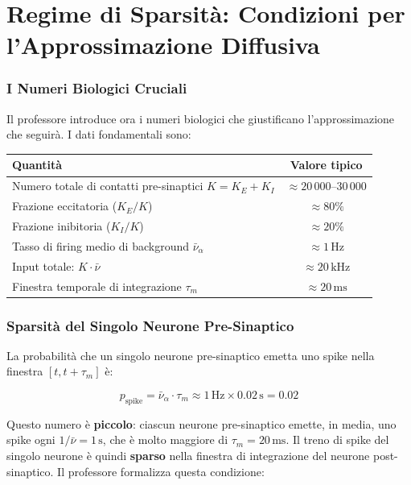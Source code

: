 \section{Regime di Sparsità: Condizioni per l'Approssimazione Diffusiva}

\subsubsection{I Numeri Biologici Cruciali}

Il professore introduce ora i numeri biologici che giustificano l'approssimazione che seguirà. I dati fondamentali sono:

\begin{table}[htbp]
    \centering
    \renewcommand{\arraystretch}{1.3}
    \begin{tabularx}{\textwidth}{|X|c|}
    \hline
    \textbf{Quantità} & \textbf{Valore tipico} \\
    \hline
    Numero totale di contatti pre-sinaptici $K = K_E + K_I$ & $\approx 20\,000$–$30\,000$ \\
    \hline
    Frazione eccitatoria ($K_E / K$) & $\approx 80\%$ \\
    \hline
    Frazione inibitoria ($K_I / K$) & $\approx 20\%$ \\
    \hline
    Tasso di firing medio di background $\bar{\nu}_\alpha$ & $\approx 1\,\text{Hz}$ \\
    \hline
    Input totale: $K \cdot \bar{\nu}$ & $\approx 20\,\text{kHz}$ \\
    \hline
    Finestra temporale di integrazione $\tau_m$ & $\approx 20\,\text{ms}$ \\
    \hline
    \end{tabularx}
\end{table}

\subsubsection{Sparsità del Singolo Neurone Pre-Sinaptico}

La probabilità che un singolo neurone pre-sinaptico emetta uno spike nella finestra $[t, t + \tau_m]$ è:

\begin{equation}
p_{\text{spike}} = \bar{\nu}_\alpha \cdot \tau_m \approx 1\,\text{Hz} \times 0.02\,\text{s} = 0.02
\end{equation}

Questo numero è \textbf{piccolo}: ciascun neurone pre-sinaptico emette, in media, uno spike ogni $1/\bar{\nu} = 1\,\text{s}$, che è molto maggiore di $\tau_m = 20\,\text{ms}$. Il treno di spike del singolo neurone è quindi \textbf{sparso} nella finestra di integrazione del neurone post-sinaptico. Il professore formalizza questa condizione:

